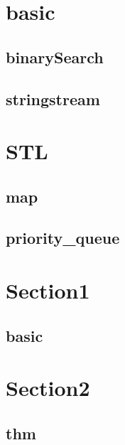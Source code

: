 \section{basic}
    \subsection{binarySearch}
        
    \subsection{stringstream}
        
\section{STL}
    \subsection{map}
        
    \subsection{priority_queue}
        

\section{Section1}
    \subsection{basic}
        

\section{Section2}
    \subsection{thm}
        